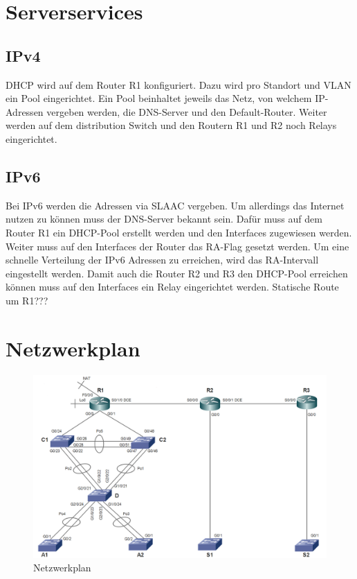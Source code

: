 \documentclass[11pt,a4paper]{scrreprt}
\begin{document}
\newpage
\section{Serverservices}
\subsection{IPv4}
\acs{DHCP} wird auf dem Router R1 konfiguriert. Dazu wird pro Standort und \acs{VLAN} ein Pool eingerichtet. Ein Pool beinhaltet jeweils das Netz, von welchem IP-Adressen vergeben werden, die \acs{DNS}-Server und den Default-Router. Weiter werden auf dem distribution Switch und den Routern R1 und R2 noch Relays eingerichtet.
\subsection{IPv6}
Bei IPv6 werden die Adressen via \acs{SLAAC} vergeben. Um allerdings das Internet nutzen zu können muss der \acs{DNS}-Server bekannt sein. Dafür muss auf dem Router R1 ein \acs{DHCP}-Pool erstellt werden und den Interfaces zugewiesen werden. Weiter muss auf den Interfaces der Router das \acs{RA}-Flag gesetzt werden. Um eine schnelle Verteilung der IPv6 Adressen 
zu erreichen, wird das \acs{RA}-Intervall eingestellt werden. Damit auch die Router R2 und R3 den \acs{DHCP}-Pool erreichen können muss auf den Interfaces ein Relay eingerichtet werden. Statische Route  um R1???
\section{Netzwerkplan}

\begin{figure} [H]
\centering
\includegraphics[angle=0,scale=0.43]{Netzwerkplan}
\caption{Netzwerkplan}
\label{abb: Netzwerkplan}
\end{figure}
\newpage
\end{document}

